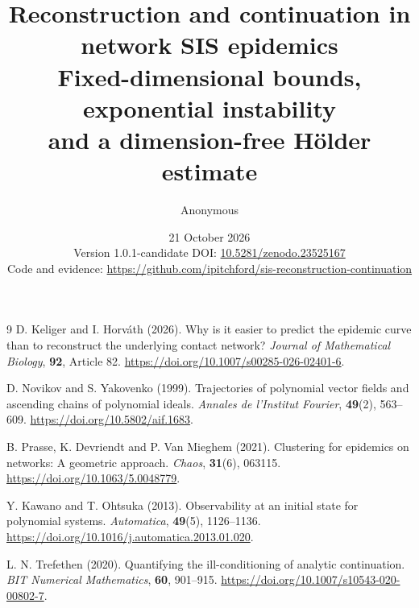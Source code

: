 \documentclass[11pt,a4paper]{article}
\title{Reconstruction and continuation in network SIS epidemics\\[5pt]\large Fixed-dimensional bounds, exponential instability\\and a dimension-free H\"older estimate}
\author{Anonymous}
\date{21 October 2026\\[4pt]\small Version 1.0.1-candidate \quad DOI: \href{https://doi.org/10.5281/zenodo.23525167}{10.5281/zenodo.23525167}\\\small Code and evidence: \url{https://github.com/ipitchford/sis-reconstruction-continuation}}
\theoremstyle{definition}
\theoremstyle{remark}
\begin{document}
\maketitle

\begin{thebibliography}{9}
D. Keliger and I. Horv\'ath (2026).
Why is it easier to predict the epidemic curve than to reconstruct the underlying contact network?
\emph{Journal of Mathematical Biology}, \textbf{92}, Article 82.
\url{https://doi.org/10.1007/s00285-026-02401-6}.

D. Novikov and S. Yakovenko (1999).
Trajectories of polynomial vector fields and ascending chains of polynomial ideals.
\emph{Annales de l'Institut Fourier}, \textbf{49}(2), 563--609.
\url{https://doi.org/10.5802/aif.1683}.

B. Prasse, K. Devriendt and P. Van Mieghem (2021).
Clustering for epidemics on networks: A geometric approach.
\emph{Chaos}, \textbf{31}(6), 063115.
\url{https://doi.org/10.1063/5.0048779}.

Y. Kawano and T. Ohtsuka (2013).
Observability at an initial state for polynomial systems.
\emph{Automatica}, \textbf{49}(5), 1126--1136.
\url{https://doi.org/10.1016/j.automatica.2013.01.020}.

L. N. Trefethen (2020).
Quantifying the ill-conditioning of analytic continuation.
\emph{BIT Numerical Mathematics}, \textbf{60}, 901--915.
\url{https://doi.org/10.1007/s10543-020-00802-7}.
\end{thebibliography}
\end{document}
